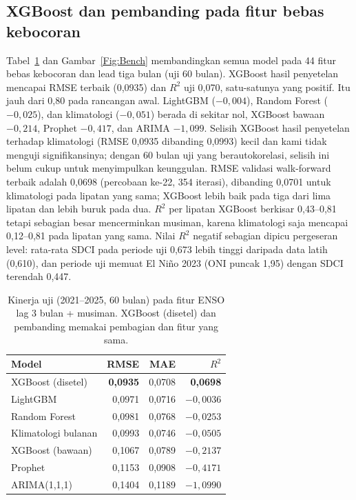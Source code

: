 \documentclass[11pt,twoside]{article}
\begin{document}
\subsection{XGBoost dan pembanding pada fitur bebas kebocoran}
\label{SubSec:ML}

Tabel~\ref{Tab:Bench} dan Gambar~\ref{Fig:Bench} membandingkan semua model pada 44 fitur bebas kebocoran dan lead tiga bulan (uji 60 bulan). XGBoost hasil penyetelan mencapai RMSE terbaik (0,0935) dan $R^2$ uji 0,070, satu-satunya yang positif. Itu jauh dari 0,80 pada rancangan awal. LightGBM ($-0{,}004$), Random Forest ($-0{,}025$), dan klimatologi ($-0{,}051$) berada di sekitar nol, XGBoost bawaan $-0{,}214$, Prophet $-0{,}417$, dan ARIMA $-1{,}099$. Selisih XGBoost hasil penyetelan terhadap klimatologi (RMSE 0,0935 dibanding 0,0993) kecil dan kami tidak menguji signifikansinya; dengan 60 bulan uji yang berautokorelasi, selisih ini belum cukup untuk menyimpulkan keunggulan. RMSE validasi walk-forward terbaik adalah 0,0698 (percobaan ke-22, 354 iterasi), dibanding 0,0701 untuk klimatologi pada lipatan yang sama; XGBoost lebih baik pada tiga dari lima lipatan dan lebih buruk pada dua. $R^2$ per lipatan XGBoost berkisar 0,43--0,81 tetapi sebagian besar mencerminkan musiman, karena klimatologi saja mencapai 0,12--0,81 pada lipatan yang sama. Nilai $R^2$ negatif sebagian dipicu pergeseran level: rata-rata SDCI pada periode uji 0,673 lebih tinggi daripada data latih (0,610), dan periode uji memuat El Ni\~no 2023 (ONI puncak 1,95) dengan SDCI terendah 0,447.

\begin{table}[ht]
\centering
\caption{Kinerja uji (2021--2025, 60 bulan) pada fitur ENSO lag 3 bulan + musiman. XGBoost (disetel) dan pembanding memakai pembagian dan fitur yang sama.}
\label{Tab:Bench}
\small
\begin{tabular}{lrrr}
\toprule
Model & RMSE & MAE & $R^2$ \\
\midrule
XGBoost (disetel)     & \textbf{0,0935} & 0,0708 & \textbf{0,0698} \\
LightGBM            & 0,0971 & 0,0716 & $-0{,}0036$ \\
Random Forest       & 0,0981 & 0,0768 & $-0{,}0253$ \\
Klimatologi bulanan & 0,0993 & 0,0746 & $-0{,}0505$ \\
XGBoost (bawaan)    & 0,1067 & 0,0789 & $-0{,}2137$ \\
Prophet             & 0,1153 & 0,0908 & $-0{,}4171$ \\
ARIMA(1,1,1)        & 0,1404 & 0,1189 & $-1{,}0990$ \\
\bottomrule
\end{tabular}
\end{table}
\end{document}

